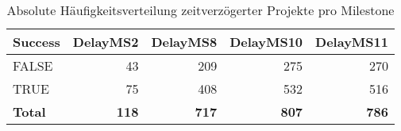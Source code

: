 \begin{table}[H]
	\centering
	\caption{Absolute Häufigkeitsverteilung zeitverzögerter Projekte pro Milestone}
	\begin{tabular}{lrrrr}
		\toprule
		\textbf{Success} & \multicolumn{1}{l}{\textbf{DelayMS2}} & \multicolumn{1}{l}{\textbf{DelayMS8}} & \multicolumn{1}{l}{\textbf{DelayMS10}} & \multicolumn{1}{l}{\textbf{DelayMS11}} \\
		\midrule
		FALSE & 43    & 209   & 275   & 270 \\
		TRUE  & 75    & 408   & 532   & 516 \\
		\bottomrule
		\textbf{Total} & \textbf{118} & \textbf{717} & \textbf{807} &  \textbf{786}
	\end{tabular}%
	\label{fdelayms}%
\end{table}
